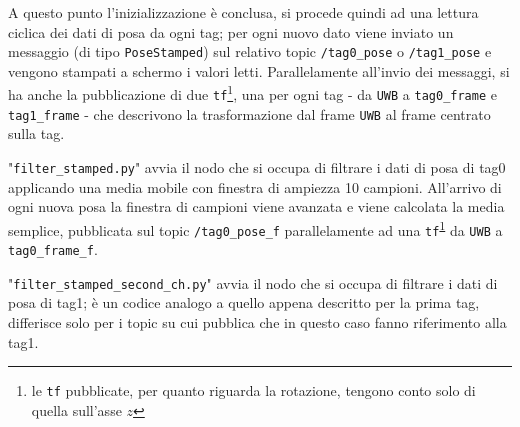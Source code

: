 A questo punto l’inizializzazione è conclusa, si procede quindi ad una lettura ciclica dei dati di posa da ogni tag; per ogni nuovo dato viene inviato un messaggio (di tipo \verb!PoseStamped!) sul relativo topic \verb!/tag0_pose! o \verb!/tag1_pose! e vengono stampati a schermo i valori letti. Parallelamente all’invio dei messaggi, si ha anche la pubblicazione di due \verb!tf!\footnote{\label{fn:tf}le \texttt{tf} pubblicate, per quanto riguarda la rotazione, tengono conto solo di quella sull'asse $z$}, una per ogni tag - da \verb!UWB! a \verb!tag0_frame! e \verb!tag1_frame! - che descrivono la trasformazione dal frame \verb!UWB! al frame centrato sulla tag.

\bigskip
	
"\verb!filter_stamped.py!" avvia il nodo che si occupa di filtrare i dati di posa di tag0 applicando una media mobile con finestra di ampiezza 10 campioni. All’arrivo di ogni nuova posa la finestra di campioni viene avanzata e viene calcolata la media semplice, pubblicata sul topic \verb!/tag0_pose_f! parallelamente ad una \verb!tf!\textsuperscript{\ref{fn:tf}} da \verb!UWB! a \verb!tag0_frame_f!.

\bigskip

"\verb!filter_stamped_second_ch.py!" avvia il nodo che si occupa di filtrare i dati di posa di tag1; è un codice analogo a quello appena descritto per la prima tag, differisce solo per i topic su cui pubblica che in questo caso fanno riferimento alla tag1.

\bigskip

